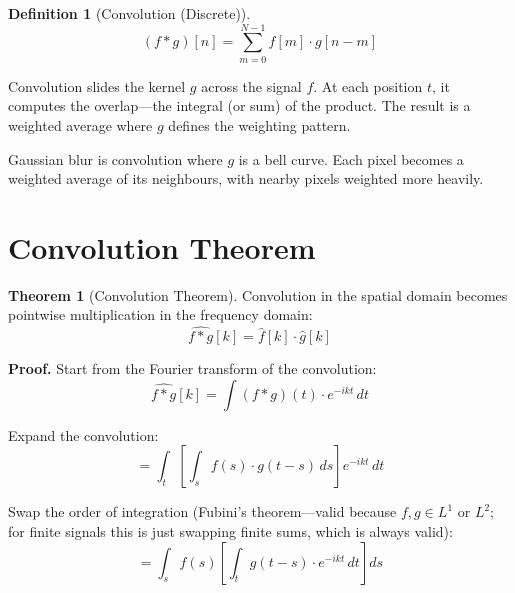 \documentclass[11pt,a4paper]{article}
\theoremstyle{definition}
\newtheorem{definition}{Definition}[section]
\newtheorem{theorem}{Theorem}[section]
\begin{document}
\begin{definition}[Convolution (Discrete)]
\begin{equation}
    (f * g)[n] = \sum_{m=0}^{N-1} f[m] \cdot g[n - m]
\end{equation}
\end{definition}

\begin{intuition}
Convolution slides the kernel $g$ across the signal $f$. At each position $t$, it computes the overlap---the integral (or sum) of the product. The result is a weighted average where $g$ defines the weighting pattern.

Gaussian blur is convolution where $g$ is a bell curve. Each pixel becomes a weighted average of its neighbours, with nearby pixels weighted more heavily.
\end{intuition}

\section{Convolution Theorem}

\begin{theorem}[Convolution Theorem]
Convolution in the spatial domain becomes pointwise multiplication in the frequency domain:
\begin{equation}
    \widehat{f * g}[k] = \hat{f}[k] \cdot \hat{g}[k]
\end{equation}
\end{theorem}

\textbf{Proof.} Start from the Fourier transform of the convolution:
\begin{equation}
    \widehat{f * g}[k] = \int (f * g)(t) \cdot e^{-ikt} \, dt
\end{equation}

Expand the convolution:
\begin{equation}
    = \int_t \left[ \int_s f(s) \cdot g(t - s) \, ds \right] e^{-ikt} \, dt
\end{equation}

Swap the order of integration (Fubini's theorem---valid because $f, g \in L^1$ or $L^2$; for finite signals this is just swapping finite sums, which is always valid):
\begin{equation}
    = \int_s f(s) \left[ \int_t g(t - s) \cdot e^{-ikt} \, dt \right] ds
\end{equation}
\end{document}
